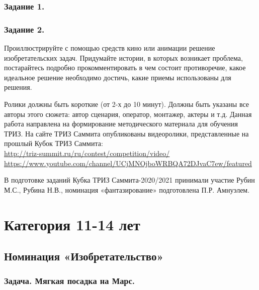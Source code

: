 \documentclass[11pt,a4paper]{article}
\begin{document}
\newcommand{\VideoTwo}{Проиллюстрируйте с помощью средств
  кино или анимации решение изобретательских задач. Придумайте истории, в
  которых возникает проблема, постарайтесь подробно прокомментировать в чем
  состоит противоречие, какое идеальное решение необходимо достичь, какие
  приемы использованы для решения.}

\newcommand{\GeneralText}{Ролики должны быть короткие (от 2-х до 10 минут).
  Должны быть указаны все авторы этого сюжета: автор сценария, оператор,
  монтажер, актеры и т.д.  Данная работа направлена на формирование
  методического материала для обучения ТРИЗ. На сайте ТРИЗ Саммита
  опубликованы видеоролики, представленные на прошлый Кубок ТРИЗ Саммита:\\
  \url{http://triz-summit.ru/ru/contest/competition/video/}\\
  \url{https://www.youtube.com/channel/UCjMNOjboWRBQA72DJvaC7ew/featured}

  В подготовке заданий Кубка ТРИЗ Саммита-2020/2021 принимали участие Рубин
  М.С., Рубина Н.В., номинация «фантазирование» подготовлена П.Р. Амнуэлем.
}

\subsubsection*{Задание 1.}\VideoOne
\subsubsection*{Задание 2.}\VideoTwo

\GeneralText
\clearpage

\section{Категория 11-14 лет}

\subsection{Номинация «Изобретательство»}

\subsubsection*{Задача. Мягкая посадка на Марс.}
\end{document}
